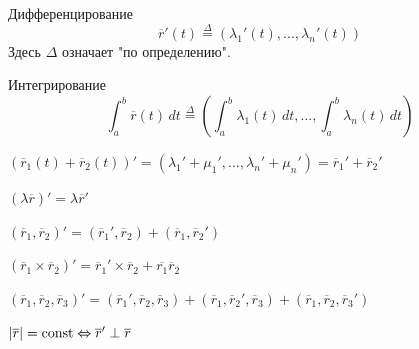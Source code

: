 \begin{Thm}
\begin{MyList}
		\item Дифференцирование
		\[\overline{r}'(t) \stackrel{\Delta}{=}\left(\lambda_1'(t), ..., \lambda_n'(t)\right)\]
		Здесь $\Delta$ означает "по определению".

		\item Интегрирование
		\[\int_a^b \overline{r}(t) \,dt \stackrel{\Delta}{=} \left(\int_a^b \lambda_1(t)\,dt, ..., \int_a^b \lambda_n(t)\,dt\right)\]
	\end{MyList}
\end{Thm}

\begin{Thm}
	\begin{MyList}
		\item $(\overline{r}_1(t) + \overline{r}_2(t))' = (\lambda_1' + \mu_1', ..., \lambda_n' + \mu_n') = \overline{r}_1' + \overline{r}_2'$
		\item $\left(\lambda \overline{r}\right)' = \lambda \overline{r}'$ 
		\item $(\overline{r}_1, \overline{r}_2)' = (\overline{r}_1', \overline{r}_2) + (\overline{r}_1, \overline{r}_2')$
		\item $(\overline{r}_1 \times \overline{r}_2)' = \overline{r}_1' \times \overline{r}_2 + \overline{r_1} \overline{r}_2$
		\item $(\overline{r}_1, \overline{r}_2, \overline{r}_3)' = (\overline{r}_1', \overline{r}_2, \overline{r}_3) + (\overline{r}_1, \overline{r}_2', \overline{r}_3) + (\overline{r}_1, \overline{r}_2, \overline{r}_3')$    
	\end{MyList}
\end{Thm}

\begin{Prop}
	$|\overline{r}| = \operatorname{const} \Leftrightarrow \overline{r}' \perp \overline{r}$
\end{Prop}

